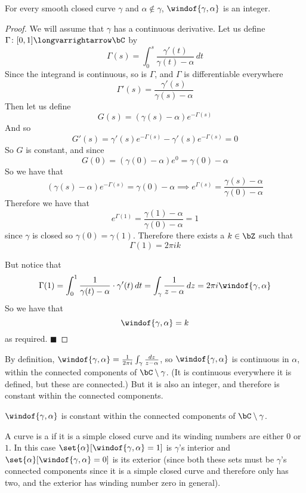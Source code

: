\documentclass[10pt]{article}
\let\longto=\longvarrightarrow
\def\qed{%
    \ifmmode%
        \eqno\blacksquare%
    \else%
        \hskip1cm\allowbreak\hbox{}\nobreak\hfill$\blacksquare$%
    \fi%
}
\begin{document}
\begin{prop*}

    For every smooth closed curve $\gamma$ and $\alpha\notin\gamma$, $\windof{\gamma,\alpha}$ is an integer.

\end{prop*}

\begin{proof}

    We will assume that $\gamma$ has a continuous derivative.
    Let us define $\Gamma\colon[0,1]\longto\bC$ by
    \[ \Gamma(s) = \int_0^s \frac{\gamma'(t)}{\gamma(t)-\alpha}\,dt \]
    Since the integrand is continuous, so is $\Gamma$, and $\Gamma$ is differentiable everywhere
    \[ \Gamma'(s) = \frac{\gamma'(s)}{\gamma(s)-\alpha} \]
    Then let us define
    \[ G(s) = (\gamma(s)-\alpha)e^{-\Gamma(s)} \]
    And so
    \[ G'(s) = \gamma'(s)e^{-\Gamma(s)} - \gamma'(s)e^{-\Gamma(s)} = 0 \]
    So $G$ is constant, and since
    \[ G(0) = (\gamma(0)-\alpha)e^0 = \gamma(0)-\alpha \]
    So we have that
    \[ (\gamma(s)-\alpha)e^{-\Gamma(s)} = \gamma(0)-\alpha \implies e^{\Gamma(s)} = \frac{\gamma(s)-\alpha}{\gamma(0)-\alpha} \]
    Therefore we have that
    \[ e^{\Gamma(1)} = \frac{\gamma(1)-\alpha}{\gamma(0)-\alpha} = 1 \]
    since $\gamma$ is closed so $\gamma(0)=\gamma(1)$.
    Therefore there exists a $k\in\bZ$ such that
    \[ \Gamma(1) = 2\pi ik \]

    But notice that
    \[ \Gamma(1) = \int_0^1 \frac1{\gamma(t)-\alpha}\cdot\gamma'(t)\,dt = \int_\gamma\frac1{z-\alpha}\,dz = 2\pi i\windof{\gamma,\alpha} \]
    So we have that
    \[ \windof{\gamma,\alpha} = k \]
    as required.
    \qed

\end{proof}

By definition, $\windof{\gamma,\alpha}=\frac1{2\pi i}\int_\gamma\frac{dz}{z-\alpha}$, so $\windof{\gamma,\alpha}$ is continuous in $\alpha$, within the connected components of $\bC\setminus\gamma$.
(It is continuous everywhere it is defined, but these are connected.)
But it is also an integer, and therefore is constant within the connected components.

\begin{prop*}

    $\windof{\gamma,\alpha}$ is constant within the connected components of $\bC\setminus\gamma$.

\end{prop*}

\begin{defn*}

    A curve is a  if it is a simple closed curve and its winding numbers are either $0$ or $1$.
    In this case $\set{\alpha}[\windof{\gamma,\alpha}=1]$ is $\gamma$'s interior and $\set{\alpha}[\windof{\gamma,\alpha}=0]$ is its exterior (since both these sets must be $\gamma$'s connected components
    since it is a simple closed curve and therefore only has two, and the exterior has winding number zero in general).

\end{defn*}
\end{document}
